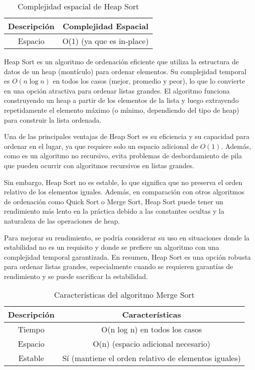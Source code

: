 \begin{table}[h]
    \centering
    \begin{tabular}{|c|c|}
        \hline
        \textbf{Descripción} & \textbf{Complejidad Espacial} \\
        \hline
        Espacio & O(1) (ya que es in-place) \\
        \hline
    \end{tabular}
    \caption{Complejidad espacial de Heap Sort}
    \label{tab:complejidad_espacial_in_place}
\end{table}
\vspace{2cm}
Heap Sort es un algoritmo de ordenación eficiente que utiliza la estructura de datos de un heap (montículo) para ordenar elementos. Su complejidad temporal es \(O(n \log n)\) en todos los casos (mejor, promedio y peor), lo que lo convierte en una opción atractiva para ordenar listas grandes. El algoritmo funciona construyendo un heap a partir de los elementos de la lista y luego extrayendo repetidamente el elemento máximo (o mínimo, dependiendo del tipo de heap) para construir la lista ordenada.

Una de las principales ventajas de Heap Sort es su eficiencia y su capacidad para ordenar en el lugar, ya que requiere solo un espacio adicional de \(O(1)\). Además, como es un algoritmo no recursivo, evita problemas de desbordamiento de pila que pueden ocurrir con algoritmos recursivos en listas grandes.

Sin embargo, Heap Sort no es estable, lo que significa que no preserva el orden relativo de los elementos iguales. Además, en comparación con otros algoritmos de ordenación como Quick Sort o Merge Sort, Heap Sort puede tener un rendimiento más lento en la práctica debido a las constantes ocultas y la naturaleza de las operaciones de heap. 

Para mejorar su rendimiento, se podría considerar su uso en situaciones donde la estabilidad no es un requisito y donde se prefiere un algoritmo con una complejidad temporal garantizada. En resumen, Heap Sort es una opción robusta para ordenar listas grandes, especialmente cuando se requieren garantías de rendimiento y se puede sacrificar la estabilidad.

\begin{table}[h]
    \centering
    \begin{tabular}{|c|c|}
        \hline
        \textbf{Descripción} & \textbf{Características} \\
        \hline
        Tiempo & O(n log n) en todos los casos \\
        \hline
        Espacio & O(n) (espacio adicional necesario) \\
        \hline
        Estable & Sí (mantiene el orden relativo de elementos iguales) \\
        \hline
    \end{tabular}
    \caption{Características del algoritmo Merge Sort}
    \label{tab:caracteristicas_algoritmo}
\end{table}

